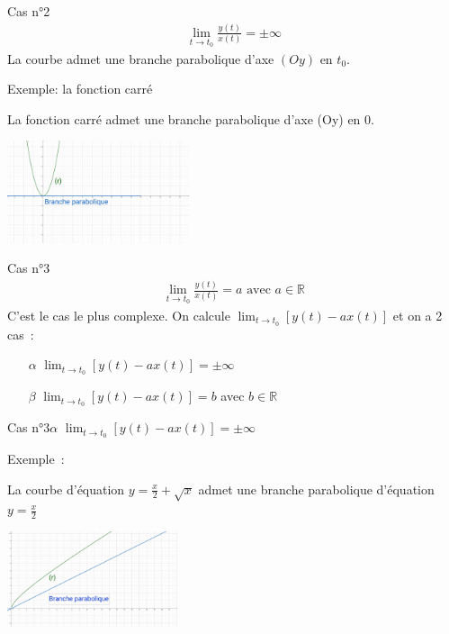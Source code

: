 \documentclass[14pt]{beamer}
\begin{document}
\begin{frame}{Cas n°2}
        \begin{align*}
                \lim_{t\to t_0}\frac{y(t)}{x(t)}=\pm\infty
        \end{align*}
        La courbe admet une branche parabolique d'axe $(Oy)$ en $t_0$.
        \begin{exampleblock}{Exemple: la fonction carré}
                \begin{minipage}[b]{5cm}
                La fonction carré admet une branche parabolique d'axe (Oy) en $0$.
                \end{minipage}
                \includegraphics[height=3cm]{images/carre.png}
        \end{exampleblock}
\end{frame}

\begin{frame}{Cas n°3}
        \begin{align*}
                \lim_{t\to t_0}\frac{y(t)}{x(t)}=a\text{ avec }a\in\mathbb{R}
        \end{align*}
        C'est le cas le plus complexe.
        On calcule $\lim_{t\to t_0}\left[y(t)-ax(t)\right]$
        et on a 2 cas~:
        \begin{itemize}
                \item[$\alpha$] $\lim_{t\to t_0}\left[y(t)-ax(t)\right]=\pm\infty$
                \item[$\beta$] $\lim_{t\to t_0}\left[y(t)-ax(t)\right]=b$ avec $b\in\mathbb{R}$
        \end{itemize}
\end{frame}

\begin{frame}{Cas n°3$\alpha$}
        $\lim_{t\to t_0}\left[y(t)-ax(t)\right]=\pm\infty$
        \begin{exampleblock}{Exemple~:}
                \begin{minipage}[b]{5cm}
                        La courbe d'équation $y=\frac{x}{2}+\sqrt{x}$
                        admet une branche parabolique d'équation $y=\frac{x}{2}$
                \end{minipage}
                \includegraphics[width=5cm]{images/branche_parabolique.png}
        \end{exampleblock}
\end{frame}
\end{document}
